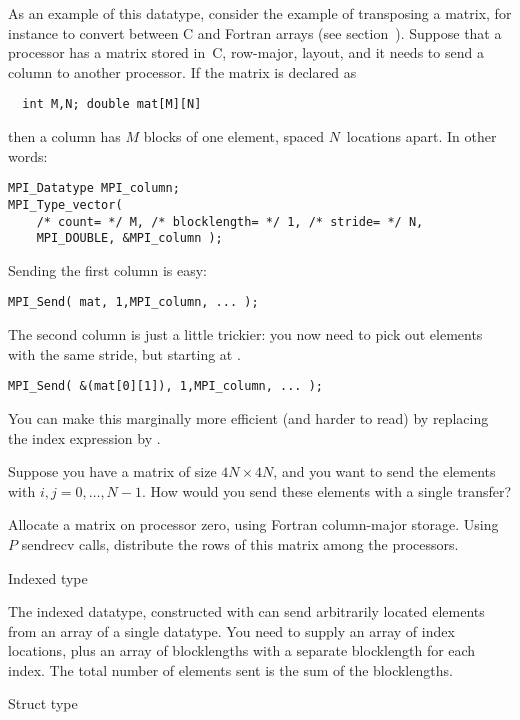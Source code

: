 As an example of this datatype, consider the example of transposing
a matrix, for instance to convert between
C and Fortran arrays (see section~). Suppose that 
a processor has a matrix stored in~C, row-major, layout, and it needs
to send a column to another processor. If the matrix is declared as
\begin{verbatim}
  int M,N; double mat[M][N]
\end{verbatim}
then a column has $M$ blocks of one element, spaced $N$~locations apart.
In other words:
\begin{verbatim}
MPI_Datatype MPI_column;
MPI_Type_vector( 
    /* count= */ M, /* blocklength= */ 1, /* stride= */ N,
    MPI_DOUBLE, &MPI_column );
\end{verbatim}
Sending the first column is easy:
\begin{verbatim}
MPI_Send( mat, 1,MPI_column, ... );
\end{verbatim}
The second column is just a little trickier: you now need to pick out 
elements with the same stride, but starting at .
\begin{verbatim}
MPI_Send( &(mat[0][1]), 1,MPI_column, ... );
\end{verbatim}
You can make this marginally more efficient (and harder to read)
by replacing the index expression by .

\begin{exercise}
  Suppose you have a matrix of size $4N\times 4N$, and you want to
  send the elements  with $i,j=0,\ldots,N-1$. How would
  you send these elements with a single transfer?
\end{exercise}

\begin{exercise}
  \label{ex:col-to-row}
  Allocate a matrix on processor zero, using Fortran column-major storage.
  Using $P$ sendrecv calls, distribute the rows of this matrix among the
  processors.
\end{exercise}

 {Indexed type}

The indexed datatype, constructed with 
can send arbitrarily located elements from an array of a single datatype.
You need to supply an array of index locations, plus an array of blocklengths
with a separate blocklength for each index. The total number of elements sent
is the sum of the blocklengths.

 {Struct type}

